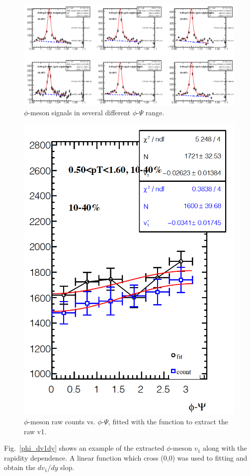 \begin{figure}[h]
\includegraphics[width=0.98\linewidth]{chapterY/fig/phi_invEP_v1_10_40.png}
\caption{$\phi$-meson signals in several different $\phi$-$\Psi$ range.}
\label{phi_v1}
\end{figure}

\begin{figure}[h]
\includegraphics[width=0.55\linewidth]{chapterY/fig/phi_invEP_v1_10_40_fit.png}
  \caption{$\phi$-meson raw counts vs. $\phi$-$\Psi$, fitted with the function to extract the raw v1.}
\label{phi_v1_fit}
\end{figure}

Fig.~\ref{phi_dv1dy} shows an example of the extracted $\phi$-meson $v_1$ along with the rapidity dependence. A linear function which cross (0,0) was used to fitting and obtain the $dv_{1}$/$dy$ slop.

